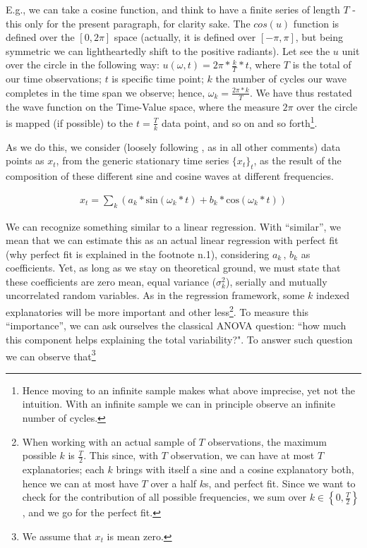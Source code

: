 \documentclass[12pt]{article} %
\begin{document}
E.g., we can take a cosine function, and think to have a finite series of length $T$ - this only for the present paragraph, for clarity sake. The $cos(u)$ function is defined over the $[0,2\pi]$ space (actually, it is defined over $[-\pi,\pi]$, but being symmetric we can lightheartedly shift to the positive radiants). Let see the $u$ unit over the circle in the following way: $u(\omega, t)=2\pi*\frac{k}{T}*t$, where $T$ is the total of our time observations; $t$ is specific time point; $k$ the number of cycles our wave completes in the time span we observe; hence, $\omega_k=\frac{2\pi*k}{T}$.  We have thus restated the wave function on the Time-Value space, where the measure $2\pi$ over the circle is mapped (if possible) to the $t=\frac{T}{k}$ data point, and so on and so forth\footnote{
Hence moving to an infinite sample makes what above imprecise, yet not the intuition. With an infinite sample we can in principle observe an infinite number of cycles.}.

As we do this, we consider (loosely following \citet{hammy}, as in all other comments) data points as $x_t$, from the generic stationary time series $\{x_t\}_t$, as the result of the composition of these different sine and cosine waves at different frequencies. 

\begin{equation}
\begin{aligned}
x_t=\sum_k(a_k*\text{sin}(\omega_k*t)+b_k*\text{cos}(\omega_k*t))
\end{aligned}
\end{equation}

We can recognize something similar to a linear regression.
With ``similar'', we mean that we can estimate this as an actual linear regression with perfect fit (why perfect fit is explained in the footnote n.1), considering $a_k\,,\,b_k$ as coefficients. Yet, as long as we stay on theoretical ground, we must state that these coefficients are zero mean, equal variance ($\sigma_k^2$), serially and mutually uncorrelated random variables. As in the regression framework, some $k$ indexed explanatories will be more important and other less\footnote{
When working with an actual sample of $T$ observations, the maximum possible $k$ is $\frac{T}{2}$. This since, with $T$ observation, we can have at most $T$ explanatories; each $k$ brings with itself a sine and a cosine explanatory both, hence we can at most have $T$ over a half $k$s, and perfect fit. Since we want to check for the contribution of all possible frequencies, we sum over $k\in\left\{0,\frac{T}{2}\right\}$, and we go for the perfect fit.}. To measure this ``importance'', we can ask ourselves the classical ANOVA question: ``how much this component helps explaining the total variability?". To answer such question we can observe that\footnote{We assume that $x_t$ is mean zero.}
\end{document}
